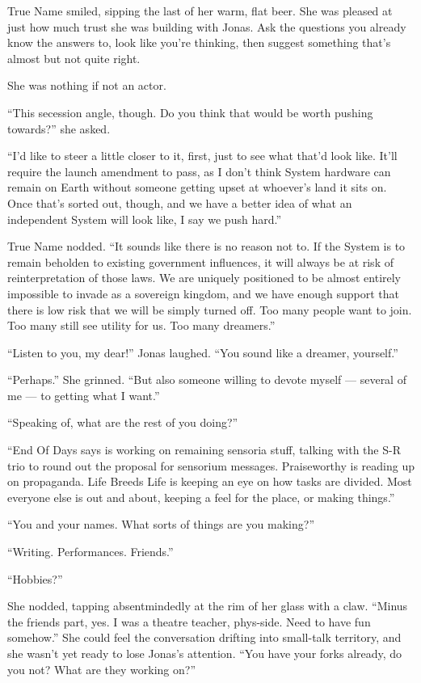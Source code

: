 True Name smiled, sipping the last of her warm, flat beer. She was pleased at just how much trust she was building with Jonas. Ask the questions you already know the answers to, look like you're thinking, then suggest something that's almost but not quite right.

She was nothing if not an actor.

``This secession angle, though. Do you think that would be worth pushing towards?'' she asked.

``I'd like to steer a little closer to it, first, just to see what that'd look like. It'll require the launch amendment to pass, as I don't think System hardware can remain on Earth without someone getting upset at whoever's land it sits on. Once that's sorted out, though, and we have a better idea of what an independent System will look like, I say we push hard.''

True Name nodded. ``It sounds like there is no reason not to. If the System is to remain beholden to existing government influences, it will always be at risk of reinterpretation of those laws. We are uniquely positioned to be almost entirely impossible to invade as a sovereign kingdom, and we have enough support that there is low risk that we will be simply turned off. Too many people want to join. Too many still see utility for us. Too many dreamers.''

``Listen to you, my dear!'' Jonas laughed. ``You sound like a dreamer, yourself.''

``Perhaps.'' She grinned. ``But also someone willing to devote myself — several of me — to getting what I want.''

``Speaking of, what are the rest of you doing?''

``End Of Days says is working on remaining sensoria stuff, talking with the S-R trio to round out the proposal for sensorium messages. Praiseworthy is reading up on propaganda. Life Breeds Life is keeping an eye on how tasks are divided. Most everyone else is out and about, keeping a feel for the place, or making things.''

``You and your names. What sorts of things are you making?''

``Writing. Performances. Friends.''

``Hobbies?''

She nodded, tapping absentmindedly at the rim of her glass with a claw. ``Minus the friends part, yes. I was a theatre teacher, phys-side. Need to have fun somehow.'' She could feel the conversation drifting into small-talk territory, and she wasn't yet ready to lose Jonas's attention. ``You have your forks already, do you not? What are they working on?''

